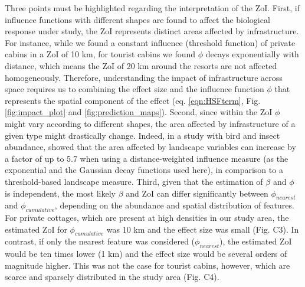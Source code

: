 \documentclass[titlepage]{article}
\begin{document}
Three points must be highlighted regarding the interpretation of the ZoI.
First, if influence functions with different shapes are found to affect the biological response under study, the ZoI represents distinct areas affected by infrastructure. For instance, while we found a constant influence (threshold function) of private cabins in a ZoI of 10 km, for tourist cabins we found $\phi$  decays exponentially with distance, which means the ZoI of 20 km around the resorts are not affected homogeneously. Therefore, understanding the impact of infrastructure across space requires us to combining the effect size and the influence function $\phi$ that represents the spatial component of the effect (eq. \ref{eqn:HSFterm}, Fig. \ref{fig:impact_plot} and \ref{fig:prediction_maps}). Second, since within the ZoI $\phi$ might vary according to different shapes, the area affected by infrastructure of a given type might drastically change. Indeed, in a study with bird and insect abundance, \citet{miguet_how_2017} showed that the area affected by landscape variables can increase by a factor of up to 5.7 when using a distance-weighted influence measure (as the exponential and the Gaussian decay functions used here), in comparison to a threshold-based landscape measure. Third, given that the estimation of $\beta$ and $\phi$ is independent, the most likely $\beta$ and ZoI can differ significantly between $\phi_{nearest}$ and $\phi_{cumulative}$, depending on the abundance and spatial distribution of features. For private cottages, which are present at high densities in our study area, the estimated ZoI for $\phi_{cumulative}$ was 10 km and the effect size was small (Fig. C3). In contrast, if only the nearest feature was considered ($\phi_{nearest}$), the estimated ZoI would be ten times lower (1 km) and the effect size would be several orders of magnitude higher. This was not the case for tourist cabins, however, which are scarce and sparsely distributed in the study area (Fig. C4).


\end{document}
